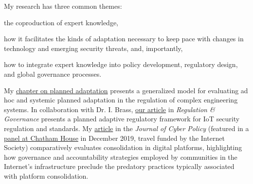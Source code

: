 \documentclass[11pt]{letter}
\begin{document}
\begin{letter}
My research has three common themes: 
  \begin{inparaenum}
    \item the coproduction of expert knowledge, 
    \item how it facilitates the kinds of adaptation necessary to keep pace with changes in technology and emerging security threats, and, importantly, 
    \item how to integrate expert knowledge into policy development, regulatory design, and global governance processes. 
  \end{inparaenum}
%
My %
  \href{https://link.springer.com/chapter/10.1007/978-3-030-05252-2_13}{chapter on planned adaptation} %
presents a generalized model for evaluating ad hoc and systemic planned adaptation in the regulation of complex engineering systems.
%
%
In collaboration with Dr. I. Brass, %
  \href{https://link.springer.com/chapter/10.1007/978-3-030-05252-2_13}{our article} %
in \emph{Regulation \& Governance} presents a planned adaptive regulatory framework for IoT security regulation and standards.
%
%
%
My %
  \href{https://www.tandfonline.com/doi/full/10.1080/23738871.2020.1754443}{article} 
in the \emph{Journal of Cyber Policy} (featured in a  \href{https://www.chathamhouse.org/2019/12/internet-consolidation-what-lies-beneath-application-layer}{panel at Chatham House} in December 2019, travel funded by the Internet Society) comparatively evaluates consolidation in digital platforms, highlighting how governance and accountability strategies employed by communities in the Internet's infrastructure preclude the predatory practices typically associated with platform consolidation. 
%

\end{letter}
\end{document}

